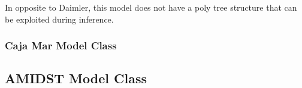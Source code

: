 In opposite to Daimler,  this model does not have a poly tree structure that can be exploited during inference. 

\subsubsection*{Caja Mar Model Class}




\subsection{AMIDST Model Class}




